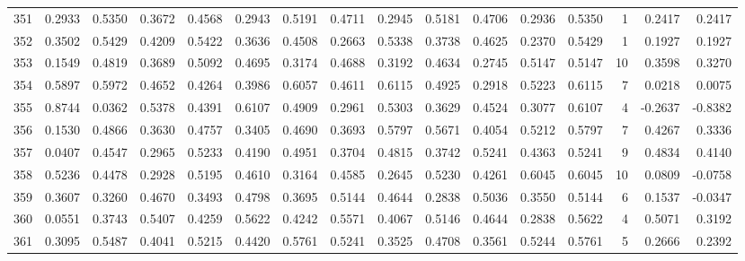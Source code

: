\begin{tabular}{lrrrrrrrrrrrrrrr}
351 &      0.2933 &  0.5350 &  0.3672 &  0.4568 &  0.2943 &  0.5191 &  0.4711 &  0.2945 &  0.5181 &  0.4706 &   0.2936 &     0.5350 &      1 &                    0.2417 &                     0.2417 \\
352 &      0.3502 &  0.5429 &  0.4209 &  0.5422 &  0.3636 &  0.4508 &  0.2663 &  0.5338 &  0.3738 &  0.4625 &   0.2370 &     0.5429 &      1 &                    0.1927 &                     0.1927 \\
353 &      0.1549 &  0.4819 &  0.3689 &  0.5092 &  0.4695 &  0.3174 &  0.4688 &  0.3192 &  0.4634 &  0.2745 &   0.5147 &     0.5147 &     10 &                    0.3598 &                     0.3270 \\
354 &      0.5897 &  0.5972 &  0.4652 &  0.4264 &  0.3986 &  0.6057 &  0.4611 &  0.6115 &  0.4925 &  0.2918 &   0.5223 &     0.6115 &      7 &                    0.0218 &                     0.0075 \\
355 &      0.8744 &  0.0362 &  0.5378 &  0.4391 &  0.6107 &  0.4909 &  0.2961 &  0.5303 &  0.3629 &  0.4524 &   0.3077 &     0.6107 &      4 &                   -0.2637 &                    -0.8382 \\
356 &      0.1530 &  0.4866 &  0.3630 &  0.4757 &  0.3405 &  0.4690 &  0.3693 &  0.5797 &  0.5671 &  0.4054 &   0.5212 &     0.5797 &      7 &                    0.4267 &                     0.3336 \\
357 &      0.0407 &  0.4547 &  0.2965 &  0.5233 &  0.4190 &  0.4951 &  0.3704 &  0.4815 &  0.3742 &  0.5241 &   0.4363 &     0.5241 &      9 &                    0.4834 &                     0.4140 \\
358 &      0.5236 &  0.4478 &  0.2928 &  0.5195 &  0.4610 &  0.3164 &  0.4585 &  0.2645 &  0.5230 &  0.4261 &   0.6045 &     0.6045 &     10 &                    0.0809 &                    -0.0758 \\
359 &      0.3607 &  0.3260 &  0.4670 &  0.3493 &  0.4798 &  0.3695 &  0.5144 &  0.4644 &  0.2838 &  0.5036 &   0.3550 &     0.5144 &      6 &                    0.1537 &                    -0.0347 \\
360 &      0.0551 &  0.3743 &  0.5407 &  0.4259 &  0.5622 &  0.4242 &  0.5571 &  0.4067 &  0.5146 &  0.4644 &   0.2838 &     0.5622 &      4 &                    0.5071 &                     0.3192 \\
361 &      0.3095 &  0.5487 &  0.4041 &  0.5215 &  0.4420 &  0.5761 &  0.5241 &  0.3525 &  0.4708 &  0.3561 &   0.5244 &     0.5761 &      5 &                    0.2666 &                     0.2392 \\

\end{tabular}
